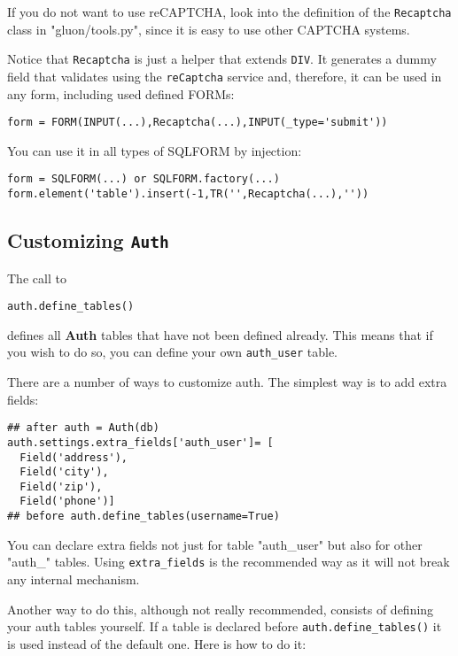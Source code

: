 \documentclass[justified,sixbynine,notoc]{tufte-book}
\def\ft{\small\tt}
\begin{document}
\begin{fullwidth}
If you do not want to use reCAPTCHA, look into the definition of the {\ft Recaptcha} class in "gluon/tools.py", since it is easy to use other CAPTCHA systems.

Notice that {\ft Recaptcha} is just a helper that extends {\ft DIV}. It generates a dummy field that validates using the {\ft reCaptcha} service and, therefore, it can be used in any form, including used defined FORMs:

\begin{lstlisting}
form = FORM(INPUT(...),Recaptcha(...),INPUT(_type='submit'))
\end{lstlisting}

You can use it in all types of SQLFORM by injection:

\begin{lstlisting}
form = SQLFORM(...) or SQLFORM.factory(...)
form.element('table').insert(-1,TR('',Recaptcha(...),''))
\end{lstlisting}

\goodbreak\subsection{Customizing {\ft Auth}}

The call to
\begin{lstlisting}
auth.define_tables()
\end{lstlisting}
\noindent defines all {\bf Auth} tables that have not been defined already. This means that if you wish to do so, you can define your own {\ft auth\_user} table.

There are a number of ways to customize auth. The simplest way is to add extra fields:

\begin{lstlisting}
## after auth = Auth(db)
auth.settings.extra_fields['auth_user']= [
  Field('address'),
  Field('city'),
  Field('zip'),
  Field('phone')]
## before auth.define_tables(username=True)
\end{lstlisting}

You can declare extra fields not just for table "auth\_user" but also for other "auth\_" tables.
Using {\ft extra\_fields} is the recommended way as it will not break any internal mechanism.

Another way to do this, although not really recommended, consists of defining your auth tables yourself. If a table is declared before {\ft auth.define\_tables()} it is used instead of the default one. Here is how to do it:


\end{fullwidth}
\end{document}
